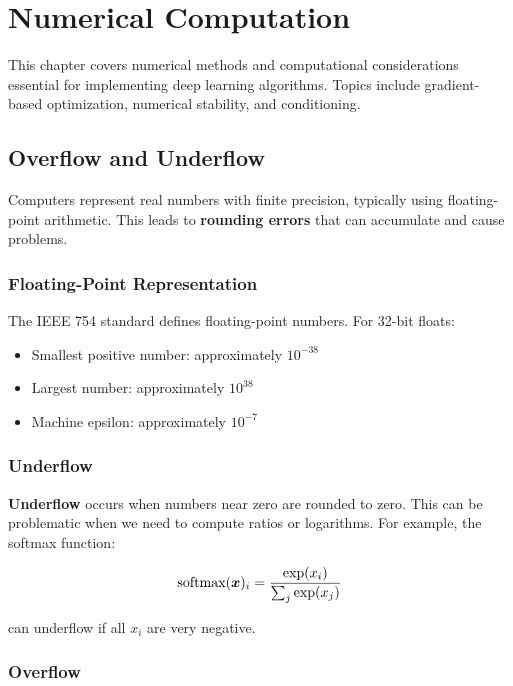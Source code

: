 
\chapter{Numerical Computation}
\label{chap:numerical-computation}

This chapter covers numerical methods and computational considerations essential for implementing deep learning algorithms. Topics include gradient-based optimization, numerical stability, and conditioning.

\section{Overflow and Underflow}
\label{sec:overflow-underflow}

Computers represent real numbers with finite precision, typically using floating-point arithmetic. This leads to \textbf{rounding errors} that can accumulate and cause problems.

\subsection{Floating-Point Representation}

The IEEE 754 standard defines floating-point numbers. For 32-bit floats:
\begin{itemize}
    \item Smallest positive number: approximately $10^{-38}$
    \item Largest number: approximately $10^{38}$
    \item Machine epsilon: approximately $10^{-7}$
\end{itemize}

\subsection{Underflow}

\textbf{Underflow} occurs when numbers near zero are rounded to zero. This can be problematic when we need to compute ratios or logarithms. For example, the softmax function:

\begin{equation}
\text{softmax}(\boldsymbol{x})_i = \frac{\exp(x_i)}{\sum_j \exp(x_j)}
\end{equation}

can underflow if all $x_i$ are very negative.

\subsection{Overflow}

